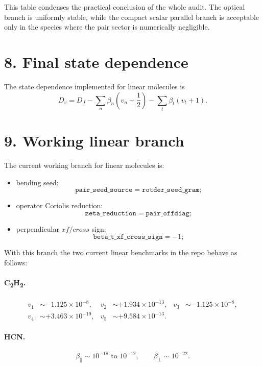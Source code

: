 \documentclass[11pt]{article}
\begin{document}
This table condenses the practical conclusion of the whole audit. The optical
branch is uniformly stable, while the compact scalar parallel branch is
acceptable only in the species where the pair sector is numerically negligible.

\section*{8. Final state dependence}

The state dependence implemented for linear molecules is
\begin{equation}
D_v = D_J - \sum_n \beta_n\left(v_n+\frac{1}{2}\right) - \sum_t \beta_t (v_t+1).
\end{equation}

\section*{9. Working linear branch}

The current working branch for linear molecules is:
\begin{itemize}
\item bending seed:
\[
\texttt{pair\_seed\_source} = \texttt{rotder\_seed\_gram};
\]
\item operator Coriolis reduction:
\[
\texttt{zeta\_reduction} = \texttt{pair\_offdiag};
\]
\item perpendicular $xf/cross$ sign:
\[
\texttt{beta\_t\_xf\_cross\_sign} = -1;
\]
\end{itemize}

With this branch the two current linear benchmarks in the repo behave as
follows:

\paragraph{C\textsubscript{2}H\textsubscript{2}.}
\begin{align*}
v_1 &\sim -1.125\times 10^{-8},
&
v_2 &\sim +1.934\times 10^{-13},
&
v_3 &\sim -1.125\times 10^{-8},
\\
v_4 &\sim +3.463\times 10^{-19},
&
v_5 &\sim +9.584\times 10^{-13}.
\end{align*}

\paragraph{HCN.}
\[
\beta_{\parallel} \sim 10^{-18}\text{ to }10^{-12},
\qquad
\beta_{\perp} \sim 10^{-22}.
\]
\end{document}
